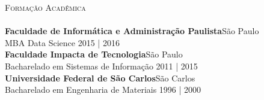 \documentclass[a4paper]{article}
\newcommand{\lineunder} {
    \vspace*{-8pt} \\
    \hspace*{-18pt} \hrulefill \\
}
\newcommand{\header} [1] {
    {\hspace*{-18pt}\vspace*{6pt} \textsc{#1}}
    \vspace*{-6pt} \lineunder
}
\begin{document}
\header{Formação Acadêmica}
\vspace{1.5mm}
\textbf{Faculdade de Informática e Administração Paulista}\hfill São Paulo\\
MBA Data Science \hfill 2015 |
2016\\
\vspace{1.5mm}
\textbf{Faculdade Impacta de Tecnologia}\hfill São Paulo\\
Bacharelado em Sistemas de Informação \hfill 2011 |
2015\\
\vspace{1.5mm}
\textbf{Universidade Federal de São Carlos}\hfill São Carlos\\
Bacharelado em Engenharia de Materiais \hfill 1996 |
2000\\
\vspace{2mm}
\end{document}
